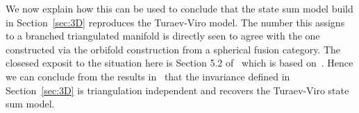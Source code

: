 We now explain how this can be used to conclude that the state sum model build in Section~\ref{sec:3D} reproduces the Turaev-Viro model.
The number this assigns to a branched triangulated manifold is directly seen to agree with the one constructed via the orbifold construction from a spherical fusion category. The closesed exposit to the situation here is Section 5.2 of~\cite{3DOrb} which is based on~\cite{Carqueville:2018sld}. Hence we can conclude from the results in~\cite{Carqueville:2018sld} that the invariance defined in Section~\ref{sec:3D} is triangulation independent and recovers the Turaev-Viro state sum model. 

